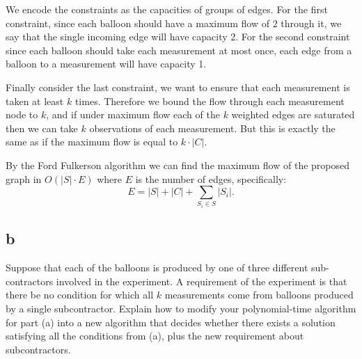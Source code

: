 \documentclass{amsart}
\theoremstyle{definition}
\theoremstyle{remark}
\numberwithin{equation}{section}
\begin{document}
We encode the constraints as the capacities of groups of edges. For the first constraint, since each balloon should have a maximum flow of $2$ through it, we say that the single incoming edge will have capacity 2. For the second constraint since each balloon should take each measurement at most once, each edge from a balloon to a measurement will have capacity 1.

Finally consider the last constraint, we want to ensure that each measurement is taken at least $k$ times. Therefore we bound the flow through each measurement node to $k$, and if under maximum flow each of the $k$ weighted edges are saturated then we can take $k$ observations of each measurement. But this is exactly the same as if the maximum flow is equal to $k \cdot |C|$.

\rmkstar By the Ford Fulkerson algorithm we can find the maximum flow of the proposed graph in $O(|S| \cdot E)$ where $E$ is the number of edges, specifically: $$E = |S| + |C| + \sum_{S_i \in S} |S_i|. $$


\subsection*{b}
Suppose that each of the balloons is produced by one of three different sub-contractors involved in the experiment. A requirement of the experiment is that there be no condition for which all $k$ measurements come from balloons produced by a single subcontractor. Explain how to modify your polynomial-time algorithm for part (a) into a new algorithm that decides whether there exists a solution satisfying all the conditions from (a), plus the new requirement about subcontractors. \\
\end{document}

